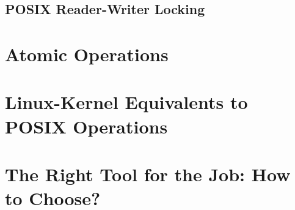 \subsection{POSIX Reader-Writer Locking}
\label{sec:toolsoftrade:POSIX Reader-Writer Locking}

\section{Atomic Operations}
\label{sec:toolsoftrade:Atomic Operations}

\section{Linux-Kernel Equivalents to POSIX Operations}
\label{sec:toolsoftrade:Linux-Kernel Equivalents to POSIX Operations}

\section{The Right Tool for the Job: How to Choose?}
\label{sec:toolsoftrade:The Right Tool for the Job: How to Choose?}
